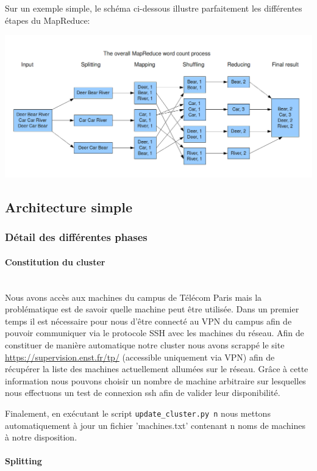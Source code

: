 \documentclass{article}
\begin{document}
Sur un exemple simple, le schéma ci-dessous illustre parfaitement les différentes étapes du MapReduce:
\begin{center}
    \includegraphics[scale=0.4]{img/archi.png}
\end{center}

\subsection{Architecture simple}
\subsubsection{Détail des différentes phases}
\paragraph{Constitution du cluster \\ \\}

Nous avons accès aux machines du campus de Télécom Paris mais la problématique est de savoir quelle machine peut être utilisée. Dans un premier temps il est nécessaire pour nous d'être
connecté au VPN du campus afin de pouvoir communiquer via le protocole SSH avec les machines du réseau. Afin de constituer de manière automatique notre cluster nous avons 
scrappé le site \url{https://supervision.enst.fr/tp/} (accessible uniquement via VPN) afin de récupérer la liste des machines actuellement allumées sur le réseau. Grâce à cette information nous
pouvons choisir un nombre de machine arbitraire sur lesquelles nous effectuons un test de connexion ssh afin de valider leur disponibilité.


Finalement, en exécutant le script \texttt{update\_cluster.py n} nous mettons automatiquement à jour un fichier 'machines.txt' contenant n noms de machines à notre disposition.


\paragraph{Splitting \\ \\}
\end{document}
